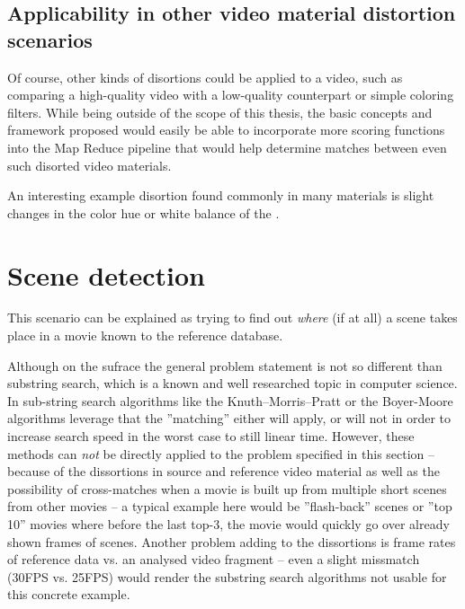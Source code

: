 \subsection{Applicability in other video material distortion scenarios}

Of course, other kinds of disortions could be applied to a video, such as comparing a high-quality video with a low-quality counterpart or simple coloring filters. While being outside of the scope of this thesis, the basic concepts and framework proposed would easily be able to incorporate more scoring functions into the Map Reduce pipeline that would help determine matches between even such disorted video materials. 

An interesting example disortion found commonly in many materials is slight changes in the color hue or white balance of the .


\section{Scene detection}
\label{sec:scene-detection}
This scenario can be explained as trying to find out \textit{where} (if at all) a scene takes place in a movie known to the reference database. 

Although on the sufrace the general problem statement is not so different than substring search, which is a known and well researched topic in computer science. In sub-string search algorithms like the Knuth–Morris–Pratt \cite{kmp-string-search} or the Boyer-Moore \cite{boyer-string-search} algorithms leverage that the ''matching'' either will apply, or will not in order to increase search speed in the worst case to still linear time. However, these methods can \textit{not} be directly applied to the problem specified in this section -- because of the dissortions in source and reference video material as well as the possibility of cross-matches when a movie is built up from multiple short scenes from other movies -- a typical example here would be ''flash-back'' scenes or ''top 10'' movies where before the last top-3, the movie would quickly go over already shown frames of scenes. Another problem adding to the dissortions is frame rates of reference data vs. an analysed video fragment -- even a slight missmatch (30FPS vs. 25FPS) would render the substring search algorithms not usable for this concrete example.

